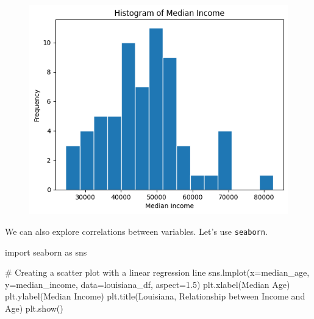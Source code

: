 \documentclass[
  letterpaper,
  DIV=11,
  numbers=noendperiod]{scrreprt}
\newenvironment{Shaded}{\begin{snugshade}}{\end{snugshade}}
\newcommand{\CommentTok}[1]{\textcolor[rgb]{0.37,0.37,0.37}{#1}}
\newcommand{\FloatTok}[1]{\textcolor[rgb]{0.68,0.00,0.00}{#1}}
\newcommand{\ImportTok}[1]{\textcolor[rgb]{0.00,0.46,0.62}{#1}}
\newcommand{\NormalTok}[1]{\textcolor[rgb]{0.00,0.23,0.31}{#1}}
\newcommand{\OperatorTok}[1]{\textcolor[rgb]{0.37,0.37,0.37}{#1}}
\newcommand{\StringTok}[1]{\textcolor[rgb]{0.13,0.47,0.30}{#1}}
\begin{document}
\begin{figure}[H]

{\centering \includegraphics{labs/w03_webArch_files/figure-pdf/cell-11-output-1.png}

}

\end{figure}

We can also explore correlations between variables. Let's use
\texttt{seaborn}.

\begin{Shaded}
\begin{Highlighting}[]
\ImportTok{import}\NormalTok{ seaborn }\ImportTok{as}\NormalTok{ sns}

\CommentTok{\# Creating a scatter plot with a linear regression line}
\NormalTok{sns.lmplot(x}\OperatorTok{=}\StringTok{\textquotesingle{}median\_age\textquotesingle{}}\NormalTok{, y}\OperatorTok{=}\StringTok{\textquotesingle{}median\_income\textquotesingle{}}\NormalTok{, data}\OperatorTok{=}\NormalTok{louisiana\_df, aspect}\OperatorTok{=}\FloatTok{1.5}\NormalTok{)}
\NormalTok{plt.xlabel(}\StringTok{\textquotesingle{}Median Age\textquotesingle{}}\NormalTok{)}
\NormalTok{plt.ylabel(}\StringTok{\textquotesingle{}Median Income\textquotesingle{}}\NormalTok{)}
\NormalTok{plt.title(}\StringTok{\textquotesingle{}Louisiana, Relationship between Income and Age\textquotesingle{}}\NormalTok{)}
\NormalTok{plt.show()}
\end{Highlighting}
\end{Shaded}
\end{document}
